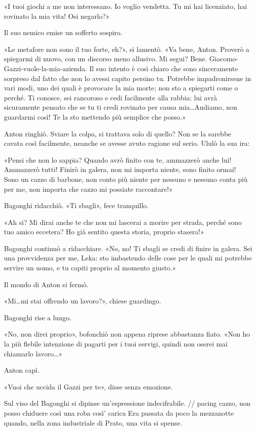«I tuoi giochi a me non interessano. Io voglio vendetta. Tu mi hai licenziato, hai rovinato la mia vita! Osi negarlo?»

Il suo nemico emise un sofferto sospiro.

«Le metafore non sono il tuo forte, eh?», si lamentò. «Va bene, Anton. Proverò a spiegarmi di nuovo, con un discorso meno allusivo. Mi segui? Bene. Giacomo-Gazzi-vuole-la-mia-azienda. Il suo intento è così chiaro che sono sinceramente sorpreso dal fatto che non lo avessi capito persino tu. Potrebbe impadronirsene in vari modi, uno dei quali è provocare la mia morte; non sto a spiegarti come o perché. Ti conosce, sei rancoroso e cedi facilmente alla rabbia: lui avrà sicuramente pensato che se tu ti credi rovinato per causa mia\ldots Andiamo, non guardarmi così! Te la sto mettendo più semplice che posso.»

Anton ringhiò. Sviare la colpa, si trattava solo di quello? Non se la sarebbe cavata così facilmente, neanche se avesse avuto ragione sul serio. Ululò la sua ira:

«Pensi che non lo sappia? Quando avrò finito con te, ammazzerò anche lui! Ammazzerò tutti! Finirò in galera, non mi importa niente, sono finito ormai! Sono un cazzo di barbone, non conto più niente per nessuno e nessuno conta più per me, non importa che cazzo mi possiate raccontare!»

Bagonghi ridacchiò. «Ti sbagli», fece tranquillo.

«Ah si? Mi dirai anche te che non mi lascerai a morire per strada, perché sono tuo amico eccetera? Ho già sentito questa storia, proprio stasera!»

Bagonghi continuò a ridacchiare. «No, no! Ti sbagli se credi di finire in galera. Sei una provvidenza per me, Leka: sto imbastendo delle cose per le quali mi potrebbe servire un uomo, e tu capiti proprio al momento giusto.»

Il mondo di Anton si fermò.

«Mi\ldots mi stai offrendo un lavoro?», chiese guardingo.

Bagonghi rise a lungo.

«No, non direi proprio», bofonchiò non appena riprese abbastanza fiato. «Non ho la più flebile intenzione di pagarti per i tuoi servigi, quindi non oserei mai chiamarlo lavoro\ldots»

Anton capì.

«Vuoi che uccida il Gazzi per te», disse senza emozione.

Sul viso del Bagonghi si dipinse un'espressione indecifrabile.
// pacing cazzo, non posso chiduere così una roba così' carica
Era passata da poco la mezzanotte quando, nella zona industriale di Prato, una vita si spense.


